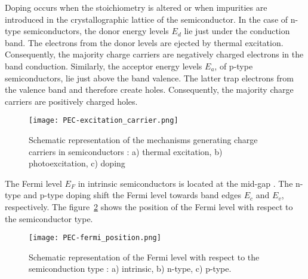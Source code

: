     Doping occurs when the stoichiometry is altered or when impurities are 
    introduced in the crystallographic lattice of the semiconductor. 
    In the case of n-type semiconductors, the donor energy levels $E_d$ lie just 
    under the conduction band. The electrons from the donor levels are ejected by 
    thermal excitation. 
    Consequently, the majority charge carriers are negatively charged electrons 
    in the band conduction. 
    Similarly, the acceptor energy levels $E_a$, of p-type semiconductors, 
    lie just above the band valence. 
    The latter trap electrons from the valence band and therefore create holes. 
    Consequently, the majority charge carriers are positively charged holes.

    \begin{figure}[h]
        \centering
        \texttt{[image: PEC-excitation\_carrier.png]}
        \caption{Schematic representation of the mechanisms generating charge carriers in semiconductors \citep{finklea1983}: 
        a) thermal excitation, b) photoexcitation, c) doping}
        \label{fig_excitation_carrier}
    \end{figure}

    The Fermi level $E_F$ in intrinsic semiconductors is located at the mid-gap . 
    The n-type and p-type doping shift the Fermi level towards band edges 
    $E_c$ and $E_v$, respectively. 
    The figure~\ref{fig_fermi_position} shows the position of the Fermi level 
    with respect to the semiconductor type. 

    \begin{figure}[H]
        \centering
        \texttt{[image: PEC-fermi\_position.png]}
        \caption{Schematic representation of the Fermi level with respect to the 
        semiconduction type \citep{finklea1983}: a) intrinsic, b) n-type, c) p-type.}
        \label{fig_fermi_position}
    \end{figure}



